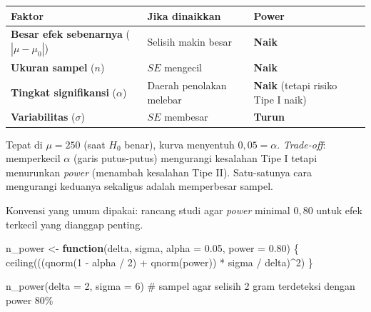 \documentclass[
  indonesian,
  letterpaper,
]{book}
\newenvironment{Shaded}{\begin{snugshade}}{\end{snugshade}}
\newcommand{\AttributeTok}[1]{\textcolor[rgb]{0.40,0.45,0.13}{#1}}
\newcommand{\CommentTok}[1]{\textcolor[rgb]{0.37,0.37,0.37}{#1}}
\newcommand{\ControlFlowTok}[1]{\textcolor[rgb]{0.00,0.23,0.31}{\textbf{#1}}}
\newcommand{\DecValTok}[1]{\textcolor[rgb]{0.68,0.00,0.00}{#1}}
\newcommand{\FloatTok}[1]{\textcolor[rgb]{0.68,0.00,0.00}{#1}}
\newcommand{\FunctionTok}[1]{\textcolor[rgb]{0.28,0.35,0.67}{#1}}
\newcommand{\NormalTok}[1]{\textcolor[rgb]{0.00,0.23,0.31}{#1}}
\newcommand{\OtherTok}[1]{\textcolor[rgb]{0.00,0.23,0.31}{#1}}
\newcommand{\SpecialCharTok}[1]{\textcolor[rgb]{0.37,0.37,0.37}{#1}}
\newcounter{none} %
\begin{document}
{\def\LTcaptype{none} %
\begin{longtable}[]{@{}
  >{\raggedright\arraybackslash}p{}
  >{\raggedright\arraybackslash}p{}
  >{\raggedright\arraybackslash}p{}@{}}
\toprule\noalign{}
\begin{minipage}[b]{\linewidth}\raggedright
Faktor
\end{minipage} & \begin{minipage}[b]{\linewidth}\raggedright
Jika dinaikkan
\end{minipage} & \begin{minipage}[b]{\linewidth}\raggedright
Power
\end{minipage} \\
\midrule\noalign{}
\endhead
\bottomrule\noalign{}
\endlastfoot
\textbf{Besar efek sebenarnya} (\(|\mu - \mu_0|\)) & Selisih makin besar
& \textbf{Naik} \\
\textbf{Ukuran sampel} (\(n\)) & \(SE\) mengecil & \textbf{Naik} \\
\textbf{Tingkat signifikansi} (\(\alpha\)) & Daerah penolakan melebar &
\textbf{Naik} (tetapi risiko Tipe I naik) \\
\textbf{Variabilitas} (\(\sigma\)) & \(SE\) membesar & \textbf{Turun} \\
\end{longtable}
}

Tepat di \(\mu = 250\) (saat \(H_0\) benar), kurva menyentuh
\(0{,}05 = \alpha\). \emph{Trade-off}: memperkecil \(\alpha\) (garis
putus-putus) mengurangi kesalahan Tipe I tetapi menurunkan \emph{power}
(menambah kesalahan Tipe II). Satu-satunya cara mengurangi keduanya
sekaligus adalah memperbesar sampel.

Konvensi yang umum dipakai: rancang studi agar \emph{power} minimal
\(0{,}80\) untuk efek terkecil yang dianggap penting.

\begin{Shaded}
\begin{Highlighting}[]
\NormalTok{n\_power }\OtherTok{\textless{}{-}} \ControlFlowTok{function}\NormalTok{(delta, sigma, }\AttributeTok{alpha =} \FloatTok{0.05}\NormalTok{, }\AttributeTok{power =} \FloatTok{0.80}\NormalTok{) \{}
  \FunctionTok{ceiling}\NormalTok{(((}\FunctionTok{qnorm}\NormalTok{(}\DecValTok{1} \SpecialCharTok{{-}}\NormalTok{ alpha }\SpecialCharTok{/} \DecValTok{2}\NormalTok{) }\SpecialCharTok{+} \FunctionTok{qnorm}\NormalTok{(power)) }\SpecialCharTok{*}\NormalTok{ sigma }\SpecialCharTok{/}\NormalTok{ delta)}\SpecialCharTok{\^{}}\DecValTok{2}\NormalTok{)}
\NormalTok{\}}

\FunctionTok{n\_power}\NormalTok{(}\AttributeTok{delta =} \DecValTok{2}\NormalTok{, }\AttributeTok{sigma =} \DecValTok{6}\NormalTok{) }\CommentTok{\# sampel agar selisih 2 gram terdeteksi dengan power 80\%}
\end{Highlighting}
\end{Shaded}
\end{document}
